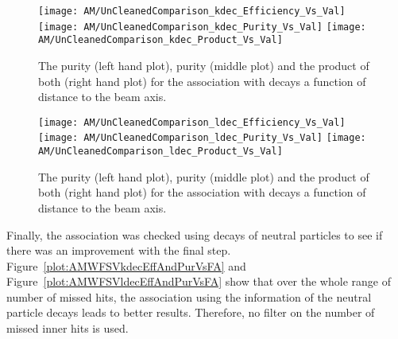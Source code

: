\begin{figure}[!ht]
  \centering
  \texttt{[image: AM/UnCleanedComparison\_kdec\_Efficiency\_Vs\_Val]}
  \texttt{[image: AM/UnCleanedComparison\_kdec\_Purity\_Vs\_Val]}
  \texttt{[image: AM/UnCleanedComparison\_kdec\_Product\_Vs\_Val]}
  \caption[Efficiency, purity and their product for the association with \PKzS{} decays a function of distance to the beam axis]{The purity (left hand plot), purity (middle plot) and the product of both (right hand plot) for the association with \PKzS{} decays a function of distance to the beam axis. \label{plot:AMWFSVkdecEffAndPurRT}}
\end{figure}
\begin{figure}[!ht]
  \centering
  \texttt{[image: AM/UnCleanedComparison\_ldec\_Efficiency\_Vs\_Val]}
  \texttt{[image: AM/UnCleanedComparison\_ldec\_Purity\_Vs\_Val]}
  \texttt{[image: AM/UnCleanedComparison\_ldec\_Product\_Vs\_Val]}
  \caption[Efficiency, purity and their product for the association with \PgL{} decays a function of distance to the beam axis]{The purity (left hand plot), purity (middle plot) and the product of both (right hand plot) for the association with \PgL{} decays a function of distance to the beam axis. \label{plot:AMWFSVldecEffAndPurRT}}
\end{figure}

Finally, the association was checked using decays of neutral particles to see if there was an improvement with the final step. Figure~\ref{plot:AMWFSVkdecEffAndPurVsFA} and Figure~\ref{plot:AMWFSVldecEffAndPurVsFA} show that over the whole range of number of missed hits, the association using the information of the neutral particle decays leads to better results. Therefore, no filter on the number of missed inner hits is used.

